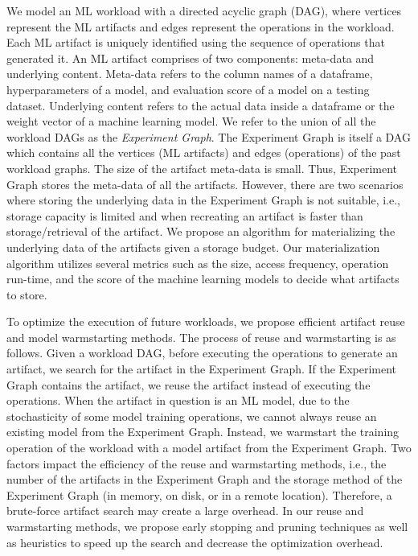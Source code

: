 We model an ML workload with a directed acyclic graph (DAG), where vertices represent the ML artifacts and edges represent the operations in the workload.
Each ML artifact is uniquely identified using the sequence of operations that generated it.
An ML artifact comprises of two components: meta-data and underlying content.
Meta-data refers to the column names of a dataframe, hyperparameters of a model, and evaluation score of a model on a testing dataset.
Underlying content refers to the actual data inside a dataframe or the weight vector of a machine learning model.
We refer to the union of all the workload DAGs as the \textit{Experiment Graph}.
The Experiment Graph is itself a DAG which contains all the vertices (ML artifacts) and edges (operations) of the past workload graphs.
The size of the artifact meta-data is small.
Thus, Experiment Graph stores the meta-data of all the artifacts.
However, there are two scenarios where storing the underlying data in the Experiment Graph is not suitable, i.e., storage capacity is limited and when recreating an artifact is faster than storage/retrieval of the artifact.
We propose an algorithm for materializing the underlying data of the artifacts given a storage budget.
Our materialization algorithm utilizes several metrics such as the size, access frequency, operation run-time, and the score of the machine learning models to decide what artifacts to store.

To optimize the execution of future workloads, we propose efficient artifact reuse and model warmstarting methods.
The process of reuse and warmstarting is as follows.
Given a workload DAG, before executing the operations to generate an artifact, we search for the artifact in the Experiment Graph.
If the Experiment Graph contains the artifact, we reuse the artifact instead of executing the operations.
When the artifact in question is an ML model, due to the stochasticity of some model training operations, we cannot always reuse an existing model from the Experiment Graph.
Instead, we warmstart the training operation of the workload with a model artifact from the Experiment Graph.
Two factors impact the efficiency of the reuse and warmstarting methods, i.e., the number of the artifacts in the Experiment Graph and the storage method of the Experiment Graph (in memory, on disk, or in a remote location).
Therefore, a brute-force artifact search may create a large overhead.
In our reuse and warmstarting methods, we propose early stopping and pruning techniques as well as heuristics to speed up the search and decrease the optimization overhead.

